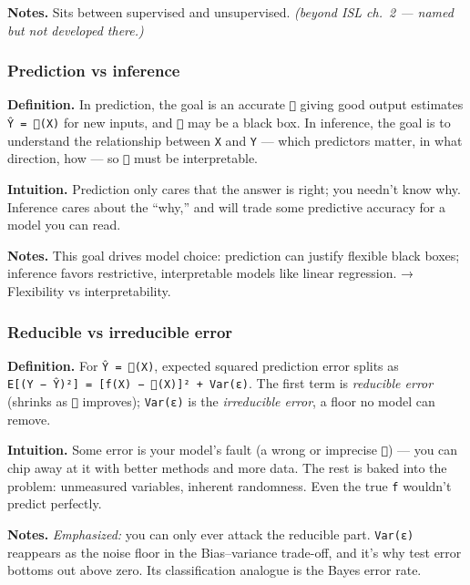 \documentclass[
  10pt,
  letterpaper,
  onecolumn]{article}
\begin{document}
\textbf{Notes.} Sits between supervised and unsupervised. \emph{(beyond
ISL ch.~2 --- named but not developed there.)}

\hypertarget{prediction-vs-inference}{%
\subsubsection{Prediction vs inference}\label{prediction-vs-inference}}

\textbf{Definition.} In prediction, the goal is an accurate \texttt{}
giving good output estimates \texttt{Ŷ\ =\ (X)} for new inputs, and
\texttt{} may be a black box. In inference, the goal is to understand
the relationship between \texttt{X} and \texttt{Y} --- which predictors
matter, in what direction, how --- so \texttt{} must be interpretable.

\textbf{Intuition.} Prediction only cares that the answer is right; you
needn't know why. Inference cares about the ``why,'' and will trade some
predictive accuracy for a model you can read.

\textbf{Notes.} This goal drives model choice: prediction can justify
flexible black boxes; inference favors restrictive, interpretable models
like linear regression. → Flexibility vs interpretability.

\hypertarget{reducible-vs-irreducible-error}{%
\subsubsection{Reducible vs irreducible
error}\label{reducible-vs-irreducible-error}}

\textbf{Definition.} For \texttt{Ŷ\ =\ (X)}, expected squared
prediction error splits as
\texttt{E{[}(Y\ −\ Ŷ)²{]}\ =\ {[}f(X)\ −\ (X){]}²\ +\ Var(ε)}. The
first term is \emph{reducible error} (shrinks as \texttt{} improves);
\texttt{Var(ε)} is the \emph{irreducible error}, a floor no model can
remove.

\textbf{Intuition.} Some error is your model's fault (a wrong or
imprecise \texttt{}) --- you can chip away at it with better methods
and more data. The rest is baked into the problem: unmeasured variables,
inherent randomness. Even the true \texttt{f} wouldn't predict
perfectly.

\textbf{Notes.} \emph{Emphasized:} you can only ever attack the
reducible part. \texttt{Var(ε)} reappears as the noise floor in the
Bias--variance trade-off, and it's why test error bottoms out above
zero. Its classification analogue is the Bayes error rate.
\end{document}
